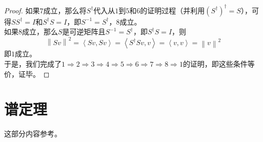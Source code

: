 \documentclass[12pt,a4paper,openany,twoside]{book}
\numberwithin{equation}{section}
\begin{document}
\begin{proof}
          如果$7$成立，那么将$S^\dagger$代入从$1$到$5$和$6$的证明过程（并利用$\left(S^\dagger\right)^\dagger=S$），可得$SS^\dagger=I$和$S^\dagger S=I$，即$S^{-1}=S^\dagger$，$8$成立。\\
          如果$8$成立，那么$S$是可逆矩阵且$S^{-1}=S^\dagger$，即$S^\dagger S=I$，则
          \begin{equation}
            \left\|Sv\right\|^2=\left\langle Sv,Sv\right\rangle=\left\langle S^\dagger Sv,v\right\rangle=\left\langle v,v\right\rangle=\left\|v\right\|^2
          \end{equation}
          即$1$成立。\\
          于是，我们完成了$1\Rightarrow2\Rightarrow3\Rightarrow4\Rightarrow5\Rightarrow6\Rightarrow7\Rightarrow8\Rightarrow1$的证明，即这些条件等价，证毕。
        \end{proof}

      \section{谱定理}
        \label{spectral_theorem}
        这部分内容参考\cite{linear_algebra_done_right}。
\end{document}
